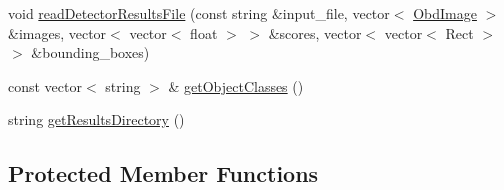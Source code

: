 \begin{DoxyCompactItemize}
\item 
void \hyperlink{classVocData_aa09be545cbd6f37a76ba5d9d664bf402}{read\-Detector\-Results\-File} (const string \&input\-\_\-file, vector$<$ \hyperlink{classObdImage}{Obd\-Image} $>$ \&images, vector$<$ vector$<$ float $>$ $>$ \&scores, vector$<$ vector$<$ Rect $>$ $>$ \&bounding\-\_\-boxes)
\item 
const vector$<$ string $>$ \& \hyperlink{classVocData_a08fa5badaacbc8152ddb13bb3b27ea38}{get\-Object\-Classes} ()
\item 
string \hyperlink{classVocData_a87a3c312091a53dbd291f7b686d51d51}{get\-Results\-Directory} ()
\end{DoxyCompactItemize}
\subsection*{Protected Member Functions}
